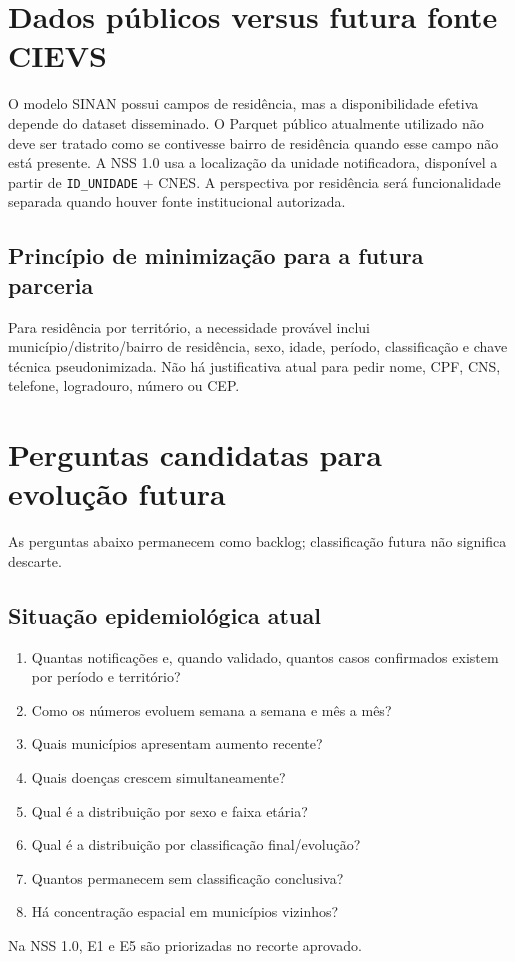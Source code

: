 \documentclass[12pt,a4paper]{article}
\begin{document}
\section{Dados públicos versus futura fonte CIEVS}
O modelo SINAN possui campos de residência, mas a disponibilidade efetiva depende do dataset disseminado. O Parquet público atualmente utilizado não deve ser tratado como se contivesse bairro de residência quando esse campo não está presente.
A NSS 1.0 usa a localização da unidade notificadora, disponível a partir de \texttt{ID\_UNIDADE} + CNES. A perspectiva por residência será funcionalidade separada quando houver fonte institucional autorizada.
\subsection{Princípio de minimização para a futura parceria}
Para residência por território, a necessidade provável inclui município/distrito/bairro de residência, sexo, idade, período, classificação e chave técnica pseudonimizada. Não há justificativa atual para pedir nome, CPF, CNS, telefone, logradouro, número ou CEP.
\section{Perguntas candidatas para evolução futura}
As perguntas abaixo permanecem como backlog; classificação futura não significa descarte.
\subsection{Situação epidemiológica atual}
\begin{enumerate}[label=\textbf{E\arabic*.},leftmargin=*]\item Quantas notificações e, quando validado, quantos casos confirmados existem por período e território?\item Como os números evoluem semana a semana e mês a mês?\item Quais municípios apresentam aumento recente?\item Quais doenças crescem simultaneamente?\item Qual é a distribuição por sexo e faixa etária?\item Qual é a distribuição por classificação final/evolução?\item Quantos permanecem sem classificação conclusiva?\item Há concentração espacial em municípios vizinhos?\end{enumerate}
Na NSS 1.0, E1 e E5 são priorizadas no recorte aprovado.
\end{document}

